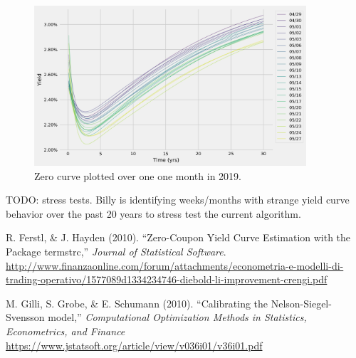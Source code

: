 \documentclass[12pt]{article}
\begin{document}
\begin{figure}[H]
	\centering
	\includegraphics[width=0.9\textwidth]{../../fig/treasury_curves/timeseries}
	\caption{Zero curve plotted over one one month in 2019.}
	\label{time}
\end{figure}

TODO: stress tests. Billy is identifying weeks/months with strange yield curve behavior over the past 20 years to stress test the current algorithm.

\begin{thebibliography}{}
R. Ferstl, \& J. Hayden (2010). 
``Zero-Coupon Yield Curve Estimation with the Package termstrc,'' 
\textit{Journal of Statistical Software}.  \url{http://www.finanzaonline.com/forum/attachments/econometria-e-modelli-di-trading-operativo/1577089d1334234746-diebold-li-improvement-crengi.pdf}

M. Gilli, S. Grobe, \& E. Schumann (2010). 
``Calibrating the Nelson-Siegel-Svensson model,'' 
\textit{Computational Optimization Methods in Statistics, Econometrics, and Finance} 
\url{https://www.jstatsoft.org/article/view/v036i01/v36i01.pdf}
\end{thebibliography}
\end{document}

